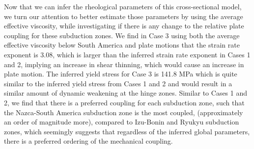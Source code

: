 \documentclass[12pt]{article}
\begin{document}
Now that we can infer the rheological parameters of this cross-sectional model, we turn our attention to better estimate those parameters by using the average effective viscosity, while investigating if there is any change to the relative plate coupling for these subduction zones.  We find in Case 3 using both the average 
effective viscosity below South America and plate motions that the strain rate exponent is 3.08, which is larger than the inferred strain rate exponent in Cases 1 and 2, implying an increase in shear thinning, which would cause an increase in plate motion. The inferred yield stress for Case 3 is 141.8 MPa which is quite similar to the inferred yield stress from Cases 1 and 2 and would result in a similar amount of dynamic weakening at the hinge zones. Similar to Cases 1 and 2, we find that there is a preferred coupling for each subduction zone, such that the Nazca-South America subduction zone is the most coupled, (approximately an order of magnitude more), compared to Izu-Bonin and Ryukyu subduction zones, which seemingly suggests that regardless of the inferred global parameters, there is a preferred ordering of the mechanical coupling.
\end{document}
